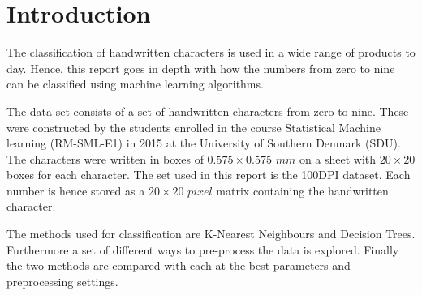 \section{Introduction}

The classification of handwritten characters is used in a wide range of products to day.
Hence, this report goes in depth with how the numbers from zero to nine can be classified using machine learning algorithms.

The data set consists of a set of handwritten characters from zero to nine.
These were constructed by the students enrolled in the course Statistical Machine learning (RM-SML-E1) in 2015 at the University of Southern Denmark (SDU).
The characters were written in boxes of $0.575 \times 0.575 \textit{ mm}$ on a sheet with $20 \times 20$ boxes for each character.
The set used in this report is the 100DPI dataset.
Each number is hence stored as a $20 \times 20 \textit{ pixel}$ matrix containing the handwritten character.

The methods used for classification are K-Nearest Neighbours and Decision Trees.
Furthermore a set of different ways to pre-process the data is explored.
Finally the two methods are compared with each at the best parameters and preprocessing settings.



